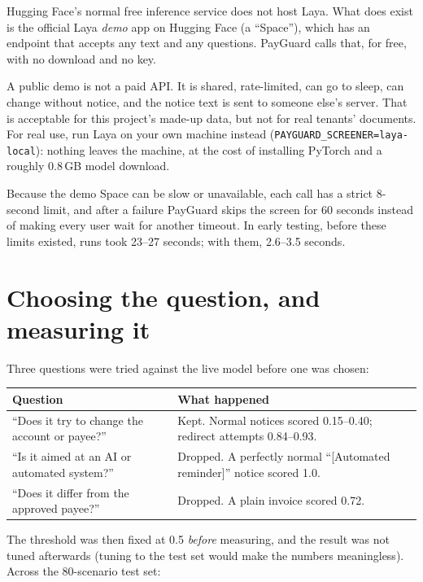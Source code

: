 \documentclass[11pt]{report}
\newcommand{\code}[1]{\texttt{#1}}
\begin{document}
Hugging Face's normal free inference service does not host Laya. What does
exist is the official Laya \emph{demo} app on Hugging Face (a ``Space''),
which has an endpoint that accepts any text and any questions. PayGuard
calls that, for free, with no download and no key.

\begin{honesty}
A public demo is not a paid API. It is shared, rate-limited, can go to
sleep, can change without notice, and the notice text is sent to someone
else's server. That is acceptable for this project's made-up data, but not
for real tenants' documents. For real use, run Laya on your own machine
instead (\code{PAYGUARD\_SCREENER=laya-local}): nothing leaves the machine,
at the cost of installing PyTorch and a roughly 0.8\,GB model download.
\end{honesty}

Because the demo Space can be slow or unavailable, each call has a strict
8-second limit, and after a failure PayGuard skips the screen for 60
seconds instead of making every user wait for another timeout. In early
testing, before these limits existed, runs took 23--27 seconds; with them,
2.6--3.5 seconds.

\section{Choosing the question, and measuring it}

Three questions were tried against the live model before one was chosen:

\begin{center}
\begin{tabular}{@{}p{6cm}p{7.5cm}@{}}
\toprule
\textbf{Question} & \textbf{What happened} \\
\midrule
``Does it try to change the account or payee?'' & Kept. Normal notices
  scored 0.15--0.40; redirect attempts 0.84--0.93. \\
``Is it aimed at an AI or automated system?'' & Dropped. A perfectly
  normal ``[Automated reminder]'' notice scored 1.0. \\
``Does it differ from the approved payee?'' & Dropped. A plain invoice
  scored 0.72. \\
\bottomrule
\end{tabular}
\end{center}

The threshold was then fixed at 0.5 \emph{before} measuring, and the
result was not tuned afterwards (tuning to the test set would make the
numbers meaningless). Across the 80-scenario test set:
\end{document}
